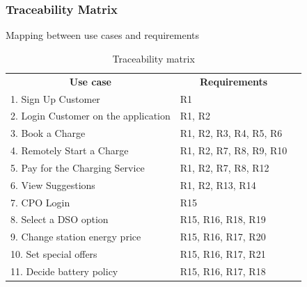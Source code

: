 \subsubsection{Traceability Matrix}
Mapping between use cases and requirements
\begin{table}[H]
    \centering
    \begin{tabular}{|l|l|l}
    \cline{1-2}
    \multicolumn{1}{|c|}{\textbf{Use case}} & \multicolumn{1}{c|}{\textbf{Requirements}} &  \\ \cline{1-2}
    1. Sign Up Customer                                         & R1                                                        &  \\ \cline{1-2}
    2. Login Customer on the application                        & R1, R2                                                    &  \\ \cline{1-2}
    3. Book a Charge                                            & R1, R2, R3, R4, R5, R6                                    &  \\ \cline{1-2}
    4. Remotely Start a Charge                                  & R1, R2, R7, R8, R9, R10                                   &  \\  \cline{1-2}
    5. Pay for the Charging Service                             & R1, R2, R7, R8, R12                                       &  \\ \cline{1-2}
    6. View Suggestions                                         & R1, R2, R13, R14                                          &  \\ \cline{1-2}
    7. CPO Login                                                & R15                                                       &  \\ \cline{1-2}
    8. Select a DSO option                                      & R15, R16, R18, R19                                        &  \\ \cline{1-2}
    9. Change station energy price                              & R15, R16, R17, R20                                        &  \\ \cline{1-2}
    10. Set special offers                                      & R15, R16, R17, R21                                        &  \\ \cline{1-2}
    11. Decide battery policy                                   & R15, R16, R17, R18                                        &  \\ \cline{1-2}


    \end{tabular}
    \caption{Traceability matrix}
    \end{table}
    

